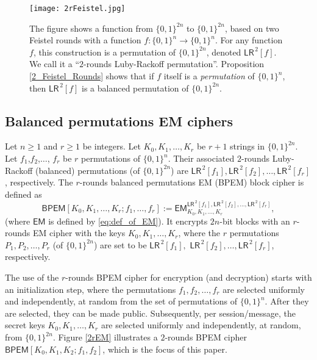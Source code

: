 \documentclass{llncs}
\newcommand{\s}{\{0,1\}}
\newcommand{\tx}{\textsf}
\begin{document}
\begin{figure}[ht!]
\centering
\texttt{[image: 2rFeistel.jpg]}
\caption{
The figure shows a function from $\{0, 1\}^{2n}$ to $\{0, 1\}^{2n}$, based on two Feistel rounds with a function $f: \{0, 1\}^n \to \{0, 1\}^n$. For any function $f$, this construction is a permutation
of $\{0, 1\}^{2n}$, denoted $\tx{LR}^{\,2}[f]$. We call it a ``$2$-rounds Luby-Rackoff permutation''.
Proposition \ref{2_Feistel_Rounds} shows that if $f$ itself is a {\it permutation} of $\{0, 1\}^n$, then
$\tx{LR}^{\,2}[f]$ is a balanced permutation of $\{0, 1\}^{2n}$.}
\label{2rFeistel}
\end{figure}

\subsection{Balanced permutations EM ciphers}

\begin{definition}
Let $n\ge 1$ and $r\ge 1$ be integers. Let $K_0, K_1, \ldots, K_r$ be $r+1$ strings in $\s^{2n}$. Let $f_1$,$f_2$,$\ldots$, $f_r$ be $r$ permutations of $\s^n$. Their associated $2$-rounds Luby-Rackoff (balanced) permutations (of $\s^{2n}$) are $\tx{LR}^{\,2}[f_1],\tx{LR}^{\,2}[f_2],\ldots,\tx{LR}^{\,2}[f_r]$, respectively. The $r$-rounds balanced permutations EM (BPEM) block cipher is  defined as
\begin{equation}\label{eq:def_of_BPEM}
\tx{BPEM}[K_0,K_1, \ldots, K_r;f_1, \ldots, f_r] := \tx{EM}^{\tx{LR}^{\,2}[f_1], \tx{LR}^{\,2}[f_2],\ldots,\tx{LR}^{\,2}[f_r]}_{K_0, K_1, \ldots, K_r},
\end{equation}
(where $ \tx{EM}$ is defined by \eqref{eq:def_of_EM}).
It encrypts $2n$-bit blocks with an $r$-rounds EM cipher with the keys $K_0, K_1, \ldots, K_r$, where the $r$ permutations $P_1,P_2,\ldots,P_r$ (of $\s^{2n}$) are set to be $\tx{LR}^{\,2}[f_1],$ $\tx{LR}^{\,2}[f_2],\ldots,\tx{LR}^{\,2}[f_r]$, respectively.
\end{definition}

The use of the $r$-rounds BPEM cipher for encryption (and decryption) starts with an initialization step, where the permutations $f_1,f_2,\ldots,f_r$ are selected uniformly and independently, at random from the set of permutations of $\s^{n}$. After they are selected, they can be made public. Subsequently, per session/message, the secret keys $K_0, K_1, \ldots, K_r$ are selected uniformly and independently, at random, from $\s^{2n}$. Figure \ref{2rEM} illustrates a $2$-rounds BPEM cipher 
$\tx{BPEM}[K_0, K_1, K_2;f_1, f_2]$, which is the focus of this paper.
\end{document}
